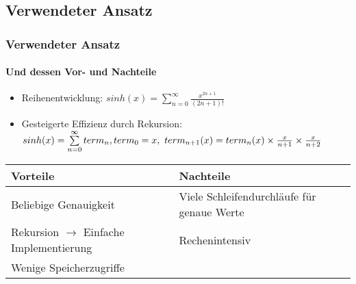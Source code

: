 	\begin{frame}
		\section{Verwendeter Ansatz}
		\frametitle{Verwendeter Ansatz}
		\framesubtitle{Und dessen Vor- und Nachteile}
		\begin{itemize}
			\item Reihenentwicklung: \begin{math}sinh(x) = \sum\limits_{n=0}^{\infty} \frac{x^{2n+1}}{(2n+1)!} \end{math}
			\item Gesteigerte Effizienz durch Rekursion: $sinh(x) = \sum\limits_{n=0}^{\infty} term_{n}, \newline term_{0} = x, \ term_{n+1}(x) = term_{n}(x) \times \frac{x}{n+1} \times \frac{x}{n+2}$
		\end{itemize}
	\begin{center}
		\begin{tabularx}{\textwidth}{*{2}{|X}|}
			\hline
			\textbf{Vorteile} & \textbf{Nachteile} \\
			\hline 
			\hline
			Beliebige Genauigkeit & Viele Schleifendurchläufe für \newline genaue Werte \\
			\hline
			Rekursion $\rightarrow$ Einfache \newline Implementierung  & Rechenintensiv \\
			\hline
			Wenige Speicherzugriffe &  \\
			\hline
		\end{tabularx}
	\end{center}
	\end{frame}
